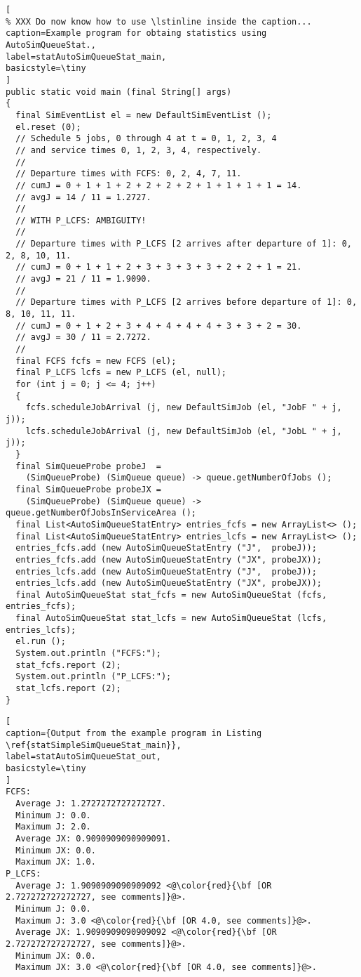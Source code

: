 \documentclass[12pt]{book}
\begin{document}
\begin{lstlisting}[
% XXX Do now know how to use \lstinline inside the caption...
caption=Example program for obtaing statistics using AutoSimQueueStat.,
label=statAutoSimQueueStat_main,
basicstyle=\tiny
]
public static void main (final String[] args)
{
  final SimEventList el = new DefaultSimEventList ();
  el.reset (0);
  // Schedule 5 jobs, 0 through 4 at t = 0, 1, 2, 3, 4
  // and service times 0, 1, 2, 3, 4, respectively.
  //
  // Departure times with FCFS: 0, 2, 4, 7, 11.
  // cumJ = 0 + 1 + 1 + 2 + 2 + 2 + 2 + 1 + 1 + 1 + 1 = 14.
  // avgJ = 14 / 11 = 1.2727.
  //
  // WITH P_LCFS: AMBIGUITY!
  //
  // Departure times with P_LCFS [2 arrives after departure of 1]: 0, 2, 8, 10, 11.
  // cumJ = 0 + 1 + 1 + 2 + 3 + 3 + 3 + 3 + 2 + 2 + 1 = 21.
  // avgJ = 21 / 11 = 1.9090.
  //
  // Departure times with P_LCFS [2 arrives before departure of 1]: 0, 8, 10, 11, 11.
  // cumJ = 0 + 1 + 2 + 3 + 4 + 4 + 4 + 4 + 3 + 3 + 2 = 30.
  // avgJ = 30 / 11 = 2.7272.    
  //
  final FCFS fcfs = new FCFS (el);
  final P_LCFS lcfs = new P_LCFS (el, null);
  for (int j = 0; j <= 4; j++)
  {
    fcfs.scheduleJobArrival (j, new DefaultSimJob (el, "JobF " + j, j));
    lcfs.scheduleJobArrival (j, new DefaultSimJob (el, "JobL " + j, j));
  }
  final SimQueueProbe probeJ  =
    (SimQueueProbe) (SimQueue queue) -> queue.getNumberOfJobs ();
  final SimQueueProbe probeJX =
    (SimQueueProbe) (SimQueue queue) -> queue.getNumberOfJobsInServiceArea ();
  final List<AutoSimQueueStatEntry> entries_fcfs = new ArrayList<> ();
  final List<AutoSimQueueStatEntry> entries_lcfs = new ArrayList<> ();
  entries_fcfs.add (new AutoSimQueueStatEntry ("J",  probeJ));
  entries_fcfs.add (new AutoSimQueueStatEntry ("JX", probeJX));
  entries_lcfs.add (new AutoSimQueueStatEntry ("J",  probeJ));
  entries_lcfs.add (new AutoSimQueueStatEntry ("JX", probeJX));
  final AutoSimQueueStat stat_fcfs = new AutoSimQueueStat (fcfs, entries_fcfs);
  final AutoSimQueueStat stat_lcfs = new AutoSimQueueStat (lcfs, entries_lcfs);
  el.run ();
  System.out.println ("FCFS:");
  stat_fcfs.report (2);
  System.out.println ("P_LCFS:");
  stat_lcfs.report (2);
}
\end{lstlisting}

\begin{lstlisting}[
caption={Output from the example program in Listing \ref{statSimpleSimQueueStat_main}},
label=statAutoSimQueueStat_out,
basicstyle=\tiny
]
FCFS:
  Average J: 1.2727272727272727.
  Minimum J: 0.0.
  Maximum J: 2.0.
  Average JX: 0.9090909090909091.
  Minimum JX: 0.0.
  Maximum JX: 1.0.
P_LCFS:
  Average J: 1.9090909090909092 <@\color{red}{\bf [OR 2.727272727272727, see comments]}@>.
  Minimum J: 0.0.
  Maximum J: 3.0 <@\color{red}{\bf [OR 4.0, see comments]}@>.
  Average JX: 1.9090909090909092 <@\color{red}{\bf [OR 2.727272727272727, see comments]}@>.
  Minimum JX: 0.0.
  Maximum JX: 3.0 <@\color{red}{\bf [OR 4.0, see comments]}@>.
\end{lstlisting}
\end{document}
